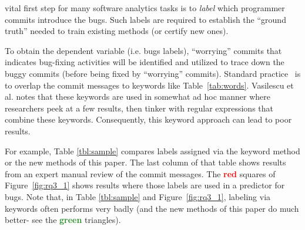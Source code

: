 \documentclass[10pt,journal,compsoc]{IEEEtran}
\newcommand{\fig}[1]{Figure~\ref{fig:#1}}
\begin{document}


  vital   first step for many software analytics tasks
is to {\em label} which  programmer commits introduce the bugs.
Such labels are required to establish the ``ground truth''
needed to train existing methods (or certify new ones).
 

 
   
  
To obtain the dependent variable (i.e. bugs labels), ``worrying'' commits that indicates bug-fixing activities will be identified and utilized to trace down the buggy commits (before being fixed by ``worrying'' commits). 
Standard 
  practice~\cite{commitguru, Kim08changes,catolino17_jitmobile,nayrolles18_clever,mockus00changeskeys,kamei12_jit,hindle08_largecommits} is to 
  overlap the commit messages to keywords like  Table~\ref{tab:words}. 
  Vasilescu et al. \cite{Vasilescu15github,Vasilescu18z}  notes that these
  keywords are used in somewhat ad hoc manner where researchers peek at a few results, then tinker   with  regular expressions that combine these keywords. 
  Consequently,   this keyword approach can lead to poor results.
  
 For example, Table \ref{tbl:sample} compares   labels assigned
    via  the keyword method or the new methods of this paper.
    The last column of that table shows   results from an expert manual review of 
    the commit messages. 
   The         \textcolor{red}{\bf red} squares of \fig{rq3_1} shows results where those labels are used in a predictor
    for bugs.
    Note that, in Table \ref{tbl:sample} and \fig{rq3_1}, labeling
    via keywords
    often performs very badly   
    (and the  new methods of this paper do much better- see the         \textcolor{ForestGreen}{\bf green} triangles). 
    
\end{document}
